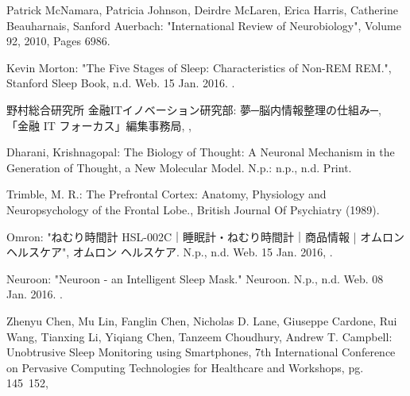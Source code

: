 \begin{bib}[100]
\begin{flushleft}
  Patrick McNamara, Patricia Johnson, Deirdre McLaren, Erica Harris, Catherine Beauharnais, Sanford Auerbach:
  \newblock "International Review of Neurobiology",
  \newblock Volume 92, 2010, Pages 6986.
\end{flushleft}

\begin{flushleft}
  Kevin Morton:
  \newblock "The Five Stages of Sleep: Characteristics of Non-REM REM.",
  \newblock Stanford Sleep Book, n.d. Web. 15 Jan. 2016.
  .
\end{flushleft}

\begin{flushleft}
  野村総合研究所 金融ITイノベーション研究部:
  \newblock 夢─脳内情報整理の仕組み─,
  \newblock 「金融 IT フォーカス」編集事務局,
  ,
\end{flushleft}

\begin{flushleft}
  Dharani, Krishnagopal:
  \newblock The Biology of Thought: A Neuronal Mechanism in the Generation of Thought,
  \newblock a New Molecular Model. N.p.: n.p., n.d. Print.
\end{flushleft}

\begin{flushleft}
  Trimble, M. R.:
  \newblock The Prefrontal Cortex: Anatomy, Physiology and Neuropsychology of the Frontal Lobe.,
  \newblock  British Journal Of Psychiatry (1989).
\end{flushleft}

\begin{flushleft}
  Omron:
  \newblock  "ねむり時間計 HSL-002C｜睡眠計・ねむり時間計｜商品情報 | オムロン ヘルスケア",
  \newblock オムロン ヘルスケア. N.p., n.d. Web. 15 Jan. 2016,
  .
\end{flushleft}

\begin{flushleft}
  Neuroon:
  \newblock  "Neuroon - an Intelligent Sleep Mask."
  \newblock Neuroon. N.p., n.d. Web. 08 Jan. 2016.
  .
\end{flushleft}

\begin{flushleft}
  Zhenyu Chen, Mu Lin, Fanglin Chen, Nicholas D. Lane, Giuseppe Cardone, Rui Wang, Tianxing Li, Yiqiang Chen, Tanzeem Choudhury, Andrew T. Campbell:
  \newblock  Unobtrusive Sleep Monitoring using Smartphones,
   7th International Conference on Pervasive Computing Technologies for Healthcare and Workshops, pg. 145~152,
\end{flushleft}


\end{bib}
